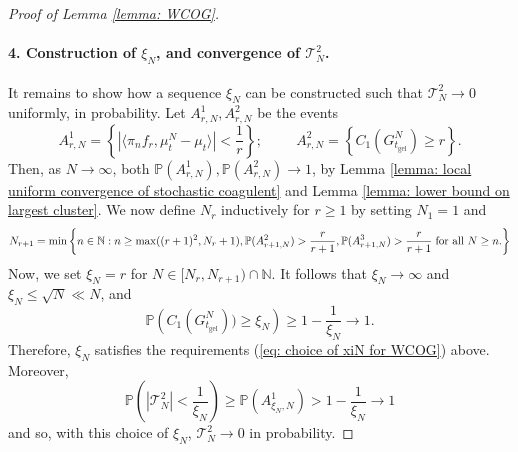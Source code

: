 \begin{proof}[Proof of Lemma \ref{lemma: WCOG}]
       \paragraph{4. Construction of $\xi_N$, and convergence of $\mathcal{T}^2_N$.} It remains to show how a sequence $\xi_N$ can be constructed such that $\mathcal{T}^2_N \rightarrow 0$ uniformly, in probability. Let $A^1_{r,N}, A^2_{r,N}$ be the events \begin{equation} \label{eq: definition of A1rn for WCOG}
       A^1_{r,N}=\left\{ |\langle \pi_n f_r, \mu^N_t-\mu_t\rangle|<\frac{1}{r}\right\}; \hspace{1cm}
       A^2_{r,N}=\left\{C_1(G^N_{t_\text{gel}}) \geq r\right\}.
   \end{equation} Then, as $N\rightarrow \infty$, both $\mathbb{P}(A^1_{r,N}), \mathbb{P}(A^2_{r,N}) \rightarrow 1$, by Lemma \ref{lemma: local uniform convergence of stochastic coagulent} and Lemma \ref{lemma: lower bound on largest cluster}. We now define $N_r$ inductively for $r\geq 1$ by setting $N_1=1$ and \begin{equation}
       \label{eq: recursive definition of Nr for WCOG} N_{r+1}=\min\left\{n \in \mathbb{N}: n\geq \max((r+1)^2, N_r+1),  \mathbb{P}(A^2_{r+1,N})>\frac{r}{r+1},  \mathbb{P}(A^3_{r+1,N})>\frac{r}{r+1} \hspace{0.1cm} \text{for all }N\geq n. \right\}
   \end{equation} Now, we set $\xi_N=r$ for $N\in [N_r, N_{r+1})\cap\mathbb{N}.$ It follows that $\xi_N \rightarrow \infty$ and $\xi_N\leq \sqrt{N}\ll N$, and \begin{equation}
       \mathbb{P}\left(C_1(G^N_{t_\text{gel}}))\geq \xi_N\right)\ge 1-\frac{1}{\xi_N} \rightarrow 1. 
   \end{equation} Therefore, $\xi_N$ satisfies the requirements (\ref{eq: choice of xiN for WCOG}) above. Moreover, \begin{equation}
       \mathbb{P}\left(|\mathcal{T}^2_N| <\frac{1}{\xi_N}\right) \ge \mathbb{P}\left(A^1_{\xi_N,N}\right) > 1-\frac{1}{\xi_N}\rightarrow 1
   \end{equation} and so, with this choice of $\xi_N$, $\mathcal{T}^2_N \rightarrow 0$ in probability. \end{proof} 